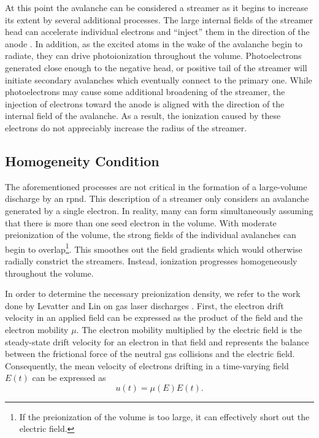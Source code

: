 At this point the avalanche can be considered a streamer as it begins to
increase its extent by several additional processes. The large internal fields
of the streamer head can accelerate individual electrons and ``inject'' them in
the direction of the anode \cite{Kunhardt1980}. In addition, as the excited
atoms in the wake of the avalanche begin to radiate, they can drive
photoionization throughout the volume. Photoelectrons generated close enough to
the negative head, or positive tail of the streamer will initiate secondary
avalanches which eventually connect to the primary one. While photoelectrons may
cause some additional broadening of the streamer, the injection of electrons
toward the anode is aligned with the direction of the internal field of the
avalanche. As a result, the ionization caused by these electrons do not
appreciably increase the radius of the streamer.

\subsection{Homogeneity Condition}

The aforementioned processes are not critical in the formation of a large-volume
discharge by an \acs{rpnd}. This description of a streamer only considers an
avalanche generated by a single electron. In reality, many can form
simultaneously assuming that there is more than one seed electron in the volume.
With moderate preionization of the volume, the strong fields of the individual
avalanches can begin to overlap\footnote{If the preionization of the volume is
too large, it can effectively short out the electric field.}. This smoothes out
the field gradients which would otherwise radially constrict the streamers.
Instead, ionization progresses homogeneously throughout the volume.

In order to determine the necessary preionization density, we refer to the work
done by Levatter and Lin on gas laser discharges \cite{Levatter1980}. First, the
electron drift velocity in an applied field can be expressed as the product of
the field and the electron mobility $\mu$. The electron mobility multiplied by
the electric field is the steady-state drift velocity for an electron in that
field and represents the balance between the frictional force of the neutral gas
collisions and the electric field. Consequently, the mean velocity of electrons
drifting in a time-varying field $E(t)$ can be expressed as
\begin{equation}
  u(t) = \mu(E) E(t).
\end{equation}

